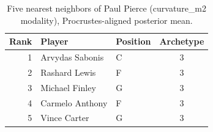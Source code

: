 \begin{table}[htbp]
  \centering\small
  \begin{tabular}{rllc}
    \toprule
    Rank & Player & Position & Archetype \\
    \midrule
    1 & Arvydas Sabonis & C & 3 \\
    2 & Rashard Lewis & F & 3 \\
    3 & Michael Finley & G & 3 \\
    4 & Carmelo Anthony & F & 3 \\
    5 & Vince Carter & G & 3 \\
    \bottomrule
  \end{tabular}
  \caption{Five nearest neighbors of Paul Pierce (curvature_m2 modality), Procrustes-aligned posterior mean.}
  \label{tab:Paul_Pierce_neighbors_curvature_m2}
\end{table}


